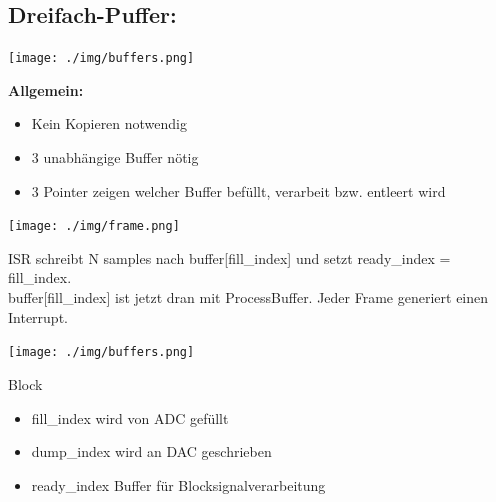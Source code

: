 \documentclass[10pt,a4paper]{article}
\begin{document}
\subsection{Dreifach-Puffer:}
\begin{center}
  \texttt{[image: ./img/buffers.png]}
\end{center}
\textbf{Allgemein:}
\begin{itemize}
  \item Kein Kopieren notwendig
  \item 3 unabhängige Buffer nötig
  \item 3 Pointer zeigen welcher Buffer befüllt, verarbeit bzw. entleert wird  
\end{itemize}

  \begin{center}
      \texttt{[image: ./img/frame.png]}
  \end{center}
ISR schreibt N samples nach buffer[fill\_index] und setzt ready\_index = fill\_index.\\ 
buffer[fill\_index] ist jetzt dran mit ProcessBuffer.
Jeder Frame generiert einen Interrupt.
  \begin{center}
      \texttt{[image: ./img/buffers.png]}
  \end{center}
  Block
\begin{itemize}
    \item fill\_index wird von ADC gefüllt
    \item dump\_index wird an DAC geschrieben
    \item ready\_index Buffer für Blocksignalverarbeitung
\end{itemize}
\end{document}
